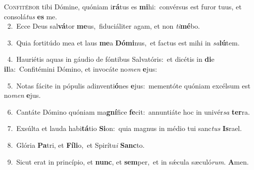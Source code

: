 \lettrine{\initial\textcolor{\initialcolor}{C}}{onfitébor} tibi Dómine, quóniam i\-\textbf{rá}\-tus es \textbf{mi}\-hi:~\star convérsus est furor tuus, et consolá\textit{tus} \textbf{es} me.\\
{\numbfont\textcolor{\numbcolor}{~2.}}~Ecce Deus sal\-\textbf{vá}\-tor \textbf{me}\-us,~\star fiduciáliter agam, et non \textit{ti}\-\textbf{mé}bo.\par
{\numbfont\textcolor{\numbcolor}{~3.}}~Quia fortitúdo mea et laus \textbf{me}\-a \textbf{Dó}\-\textbf{mi}nus,~\star et factus est mihi in \textit{sa}\-\textbf{lú}tem.\par
{\numbfont\textcolor{\numbcolor}{~4.}}~Hauriétis aquas in gáudio de fóntibus Salvatóris:~\dagger et dicétis in \textbf{di}\-e \textbf{il}\-la:~\star Confitémini Dómino, et invocáte no\textit{men} \textbf{e}\-jus:\par
{\numbfont\textcolor{\numbcolor}{~5.}}~Notas fácite in pópulis adinventi\-\textbf{ó}\-nes \textbf{e}\-jus:~\star mementóte quóniam excélsum est no\textit{men} \textbf{e}\-jus.\par
{\numbfont\textcolor{\numbcolor}{~6.}}~Cantáte Dómino quóniam ma\-\textbf{gní}\-fice \textbf{fe}\-cit:~\star annuntiáte hoc in univér\textit{sa} \textbf{ter}\-ra.\par
{\numbfont\textcolor{\numbcolor}{~7.}}~Exsúlta et lauda habi\-\textbf{tá}\-tio \textbf{Si}\-on:~\star quia magnus in médio tui sanc\textit{tus} \textbf{Is}\-rael.\par
{\numbfont\textcolor{\numbcolor}{~8.}}~Glória \textbf{Pa}\-tri, et \textbf{Fí}\-\textbf{li}o,~\star et Spirítu\textit{i} \textbf{Sanc}\-to.\par
{\numbfont\textcolor{\numbcolor}{~9.}}~Sicut erat in princípio, et \textbf{nunc}\-, et \textbf{sem}\-per,~\star et in sǽcula sæculó\-\textit{rum}\-. \textbf{A}\-men.\par
